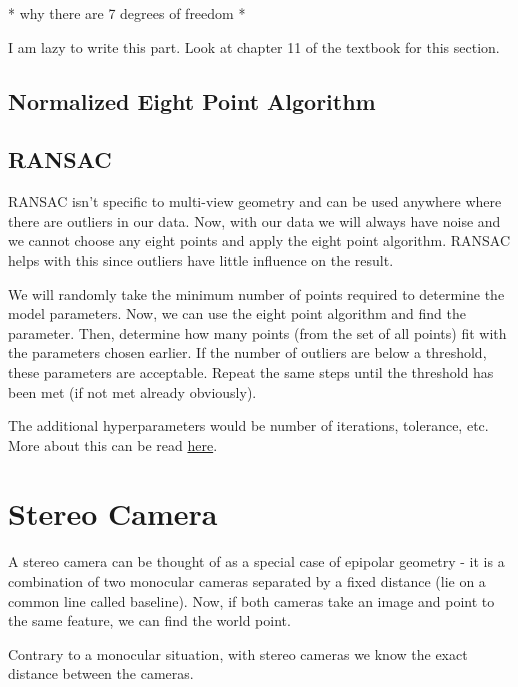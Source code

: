 * why there are 7 degrees of freedom *

I am lazy to write this part. Look at chapter 11 of the textbook for this section. 

\subsection{Normalized Eight Point Algorithm}



\subsection{RANSAC}

RANSAC isn't specific to multi-view geometry and can be used anywhere where there are outliers in our data. Now, with our data we will always have noise and we cannot choose any eight points and apply the eight point algorithm. RANSAC helps with this since outliers have little influence on the result. 

We will randomly take the minimum number of points required to determine the model parameters. Now, we can use the eight point algorithm and find the parameter. Then, determine how many points (from the set of all points) fit with the parameters chosen earlier. If the number of outliers are below a threshold, these parameters are acceptable. Repeat the same steps until the threshold has been met (if not met already obviously). 

The additional hyperparameters would be number of iterations, tolerance, etc. More about this can be read \href{http://www.cse.yorku.ca/~kosta/CompVis_Notes/ransac.pdf}{here}.

\section{Stereo Camera}

A stereo camera can be thought of as a special case of epipolar geometry - it is a combination of two monocular cameras separated by a fixed distance (lie on a common line called baseline). Now, if both cameras take an image and point to the same feature, we can find the world point.

Contrary to a monocular situation, with stereo cameras we know the exact distance between the cameras. 